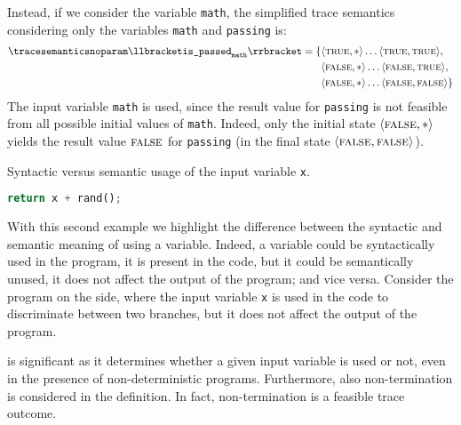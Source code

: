 \begin{example}
Instead, if we consider the variable \texttt{math}, the simplified trace semantics considering only the variables \texttt{math} and \texttt{passing} is:
\begin{align*}
  \tracesemanticsnoparam\semanticsof{\texttt{is\_passed}_\texttt{math}}
  =
  \{
    &\tuple\true\anyvalue\dots\tuple\true\true, \\
    &\tuple\false\anyvalue\dots\tuple\false\true, \\
    &\tuple\false\anyvalue\dots\tuple\false\false
  \}
\end{align*}
The input variable \texttt{math} is used, since the result value for \texttt{passing} is not feasible from all possible initial values of \texttt{math}.
Indeed, only the initial state $\langle \textsc{false}, {*} \rangle$ yields the result value $\textsc{false}$ for \texttt{passing} (in the final state $\langle \textsc{false}, \textsc{false} \rangle$).
\end{example}

\begin{example}
  \begin{marginlisting}
    \caption{Syntactic versus semantic usage of the input variable \texttt{x}.}
    \vspace{2\lineheight}
  \begin{lstlisting}[language=Python]
return x + rand();
\end{lstlisting}
  \end{marginlisting}
With this second example we highlight the difference between the syntactic and semantic meaning of using a variable. Indeed, a variable could be syntactically used in the program, \ie it is present in the code, but it could be semantically unused, \ie it does not affect the output of the program; and vice versa.
Consider the program on the side, where the input variable \texttt{x} is used in the code to discriminate between two branches, but it does not affect the output of the program.
\end{example}

 is significant as it determines whether a given input variable is used or not, even in the presence of non-deterministic programs.
Furthermore, also non-termination is considered in the definition.
In fact, non-termination is a feasible trace outcome.

